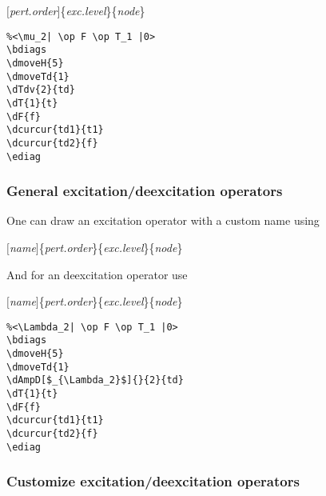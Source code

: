 \documentclass[a4paper]{article}
\newcommand{\myind}{\hspace{10pt}}
\begin{document}
\myind{\bf \textbackslash dTdv}$[${\it pert.order}$]$\{{\it exc.level}\}\{{\it node}\}

 \begin{minipage}[b]{0.5\linewidth}\centering
  \begin{lstlisting}
%<\mu_2| \op F \op T_1 |0>
\bdiags
\dmoveH{5}
\dmoveTd{1}
\dTdv{2}{td}
\dT{1}{t}
\dF{f}
\dcurcur{td1}{t1}
\dcurcur{td2}{f}
\ediag
  \end{lstlisting}
 \end{minipage}
 \begin{minipage}[b]{0.5\linewidth}\centering
\bdiags
{}
\ediag
 \end{minipage}

\subsubsection{General excitation/deexcitation operators}

One can draw an excitation operator with a custom name using

\myind{\bf \textbackslash dAmp}$[${\it name}$]$\{{\it pert.order}\}\{{\it exc.level}\}\{{\it node}\}

And for an deexcitation operator use 

\myind{\bf \textbackslash dAmpD}$[${\it name}$]$\{{\it pert.order}\}\{{\it exc.level}\}\{{\it node}\}

 \begin{minipage}[b]{0.5\linewidth}\centering
  \begin{lstlisting}
%<\Lambda_2| \op F \op T_1 |0>
\bdiags
\dmoveH{5}
\dmoveTd{1}
\dAmpD[$_{\Lambda_2}$]{}{2}{td}
\dT{1}{t}
\dF{f}
\dcurcur{td1}{t1}
\dcurcur{td2}{f}
\ediag
  \end{lstlisting}
 \end{minipage}
 \begin{minipage}[b]{0.5\linewidth}\centering
\bdiags
{}
\ediag
 \end{minipage}

\subsubsection{Customize excitation/deexcitation operators}
\end{document}
